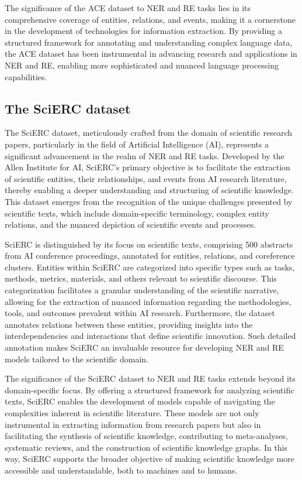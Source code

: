 The significance of the ACE dataset to NER and RE tasks lies in its comprehensive coverage of entities, relations, and events, making it a cornerstone in the development of technologies for information extraction. By providing a structured framework for annotating and understanding complex language data, the ACE dataset has been instrumental in advancing research and applications in NER and RE, enabling more sophisticated and nuanced language processing capabilities.
\subsection{The SciERC dataset}
The SciERC dataset, meticulously crafted from the domain of scientific research papers, particularly in the field of Artificial Intelligence (AI), represents a significant advancement in the realm of NER and RE tasks\cite{luan2018multitask}. Developed by the Allen Institute for AI, SciERC's primary objective is to facilitate the extraction of scientific entities, their relationships, and events from AI research literature, thereby enabling a deeper understanding and structuring of scientific knowledge. This dataset emerges from the recognition of the unique challenges presented by scientific texts, which include domain-specific terminology, complex entity relations, and the nuanced depiction of scientific events and processes.

SciERC is distinguished by its focus on scientific texts, comprising 500 abstracts from AI conference proceedings, annotated for entities, relations, and coreference clusters. Entities within SciERC are categorized into specific types such as tasks, methods, metrics, materials, and others relevant to scientific discourse. This categorization facilitates a granular understanding of the scientific narrative, allowing for the extraction of nuanced information regarding the methodologies, tools, and outcomes prevalent within AI research. Furthermore, the dataset annotates relations between these entities, providing insights into the interdependencies and interactions that define scientific innovation. Such detailed annotation makes SciERC an invaluable resource for developing NER and RE models tailored to the scientific domain.

The significance of the SciERC dataset to NER and RE tasks extends beyond its domain-specific focus. By offering a structured framework for analyzing scientific texts, SciERC enables the development of models capable of navigating the complexities inherent in scientific literature. These models are not only instrumental in extracting information from research papers but also in facilitating the synthesis of scientific knowledge, contributing to meta-analyses, systematic reviews, and the construction of scientific knowledge graphs. In this way, SciERC supports the broader objective of making scientific knowledge more accessible and understandable, both to machines and to humans.

